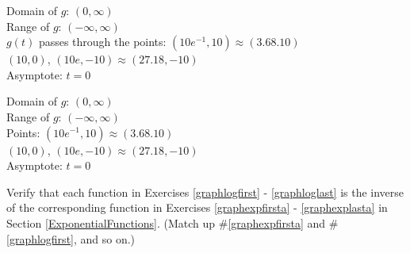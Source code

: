 \documentclass{ximera}
\begin{document}
\begin{question}
\begin{problem}
\begin{solution}
Domain of $g$:  $(0, \infty)$\\
 Range of $g$:  $(-\infty, \infty)$\\
 $g(t)$ passes through the points:  $(10e^{-1}, 10) \approx (3.68. 10)$ \\
 $(10,0)$, $(10e, -10) \approx (27.18, -10)$ \\
 Asymptote: $t = 0$ \\
\end{solution}

\begin{solution}
     Domain of $g$:  $(0, \infty)$\\
 Range of $g$:  $(-\infty, \infty)$\\
 Points:  $(10e^{-1}, 10) \approx (3.68. 10)$ \\
 $(10,0)$, $(10e, -10) \approx (27.18, -10)$ \\
 Asymptote: $t = 0$ \\
\end{solution}
\end{problem}

\end{question}

\begin{problem}
Verify that each function in Exercises \ref{graphlogfirst} - \ref{graphloglast} is the inverse of the corresponding function in Exercises \ref{graphexpfirsta} - \ref{graphexplasta} in Section \ref{ExponentialFunctions}.  (Match up \#\ref{graphexpfirsta} and \#\ref{graphlogfirst}, and so on.)    
\end{problem}
  
\end{document}
